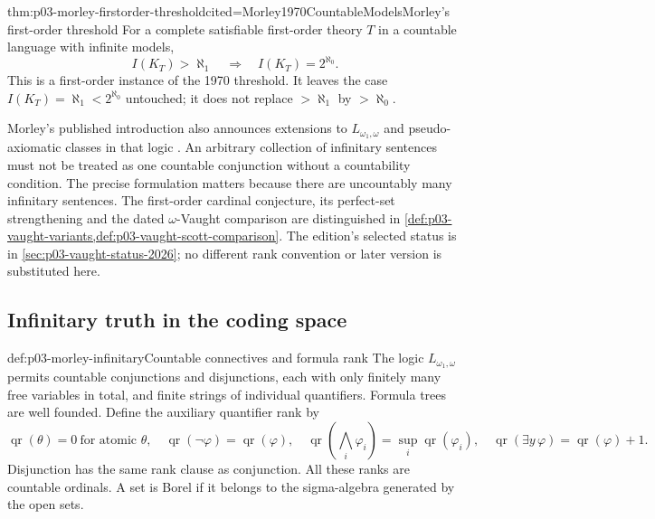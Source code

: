\begin{hbtheorem}{thm:p03-morley-firstorder-threshold}{cited=Morley1970CountableModels}{Morley's first-order threshold}
For a complete satisfiable first-order theory \(T\) in a
countable language with infinite models,
\[
 I(K_T)>\aleph_1
       \quad\Longrightarrow\quad I(K_T)=2^{\aleph_0}.
\]
This is a first-order instance of the 1970 threshold.
It leaves the case \(I(K_T)=\aleph_1<2^{\aleph_0}\)
untouched; it does not replace \(>\aleph_1\) by
\(>\aleph_0\).
\end{hbtheorem}

Morley's published introduction also announces extensions to
\(L_{\omega_1,\omega}\) and pseudo-axiomatic classes in that
logic \cite[p.~14]{Morley1970CountableModels}.
An arbitrary collection of infinitary sentences must not
be treated as one countable conjunction without a countability
condition. The precise formulation matters because there are
uncountably many infinitary sentences.
The first-order cardinal conjecture, its perfect-set
strengthening and the dated \(\omega\)-Vaught comparison
are distinguished in
\cref{def:p03-vaught-variants,def:p03-vaught-scott-comparison}.
The edition's selected status is in
\cref{sec:p03-vaught-status-2026}; no different rank convention
or later version is substituted here.

\subsection{Infinitary truth in the coding space}
\label{sec:p03-morley-borel-truth}

\begin{hbdefinition}{def:p03-morley-infinitary}{Countable connectives and formula rank}
The logic \(L_{\omega_1,\omega}\) permits countable
conjunctions and disjunctions, each with only finitely
many free variables in total, and finite strings of
individual quantifiers. Formula trees are well founded.
Define the auxiliary quantifier rank by
\[
 \operatorname{qr}(\theta)=0\ \text{for atomic }\theta,\quad
 \operatorname{qr}(\neg\varphi)=\operatorname{qr}(\varphi),
 \quad
 \operatorname{qr}\!\left(\bigwedge_i\varphi_i\right)
              =\sup_i\operatorname{qr}(\varphi_i),
 \quad
 \operatorname{qr}(\exists y\,\varphi)
              =\operatorname{qr}(\varphi)+1.
\]
Disjunction has the same rank clause as conjunction.
All these ranks are countable ordinals.
A set is Borel if it belongs to the sigma-algebra
generated by the open sets.
\end{hbdefinition}

